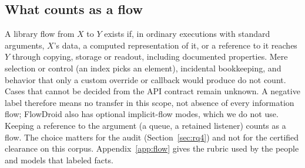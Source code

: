 \subsection{What counts as a flow}
\label{sec:flow}
A library flow from $X$ to $Y$ exists if, in ordinary executions with standard arguments, $X$'s data, a computed representation of it, or a reference to it reaches $Y$ through copying, storage or readout, including documented properties.
Mere selection or control (an index picks an element), incidental bookkeeping, and behavior that only a custom override or callback would produce do not count.
Cases that cannot be decided from the API contract remain unknown.
A negative label therefore means no transfer in this scope, not absence of every information flow; FlowDroid also has optional implicit-flow modes, which we do not use.
Keeping a reference to the argument (a queue, a retained listener) counts as a flow.
The choice matters for the audit (Section~\ref{sec:rq4}) and not for the certified clearance on this corpus.
Appendix~\ref{app:flow} gives the rubric used by the people and models that labeled facts.

